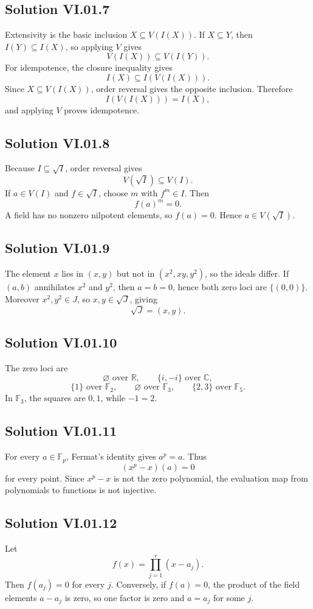 \subsection*{Solution VI.01.7}
Extensivity is the basic inclusion \(X\subseteq V(I(X))\).  If \(X\subseteq Y\), then
\(I(Y)\subseteq I(X)\), so applying \(V\) gives
\[
V(I(X))\subseteq V(I(Y)).
\]
For idempotence, the closure inequality gives
\[
I(X)\subseteq I(V(I(X))).
\]
Since \(X\subseteq V(I(X))\), order reversal gives the opposite inclusion.  Therefore
\[
I(V(I(X)))=I(X),
\]
and applying \(V\) proves idempotence.

\subsection*{Solution VI.01.8}
Because \(I\subseteq\sqrt I\), order reversal gives
\[
V(\sqrt I)\subseteq V(I).
\]
If \(a\in V(I)\) and \(f\in\sqrt I\), choose \(m\) with \(f^m\in I\).  Then
\[
f(a)^m=0.
\]
A field has no nonzero nilpotent elements, so \(f(a)=0\).  Hence
\(a\in V(\sqrt I)\).

\subsection*{Solution VI.01.9}
The element \(x\) lies in \((x,y)\) but not in \((x^2,xy,y^2)\), so the ideals differ.
If \((a,b)\) annihilates \(x^2\) and \(y^2\), then \(a=b=0\), hence both zero loci are
\(\{(0,0)\}\).  Moreover \(x^2,y^2\in J\), so \(x,y\in\sqrt J\), giving
\[
\sqrt J=(x,y).
\]

\subsection*{Solution VI.01.10}
The zero loci are
\[
\varnothing\text{ over }\mathbb R,
\qquad
\{i,-i\}\text{ over }\mathbb C,
\]
\[
\{1\}\text{ over }\mathbb F_2,
\qquad
\varnothing\text{ over }\mathbb F_3,
\qquad
\{2,3\}\text{ over }\mathbb F_5.
\]
In \(\mathbb F_3\), the squares are \(0,1\), while \(-1=2\).

\subsection*{Solution VI.01.11}
For every \(a\in\mathbb F_p\), Fermat's identity gives \(a^p=a\).  Thus
\[
(x^p-x)(a)=0
\]
for every point.  Since \(x^p-x\) is not the zero polynomial, the evaluation map from
polynomials to functions is not injective.

\subsection*{Solution VI.01.12}
Let
\[
f(x)=\prod_{j=1}^r(x-a_j).
\]
Then \(f(a_j)=0\) for every \(j\).  Conversely, if \(f(a)=0\), the product of the field
elements \(a-a_j\) is zero, so one factor is zero and \(a=a_j\) for some \(j\).

